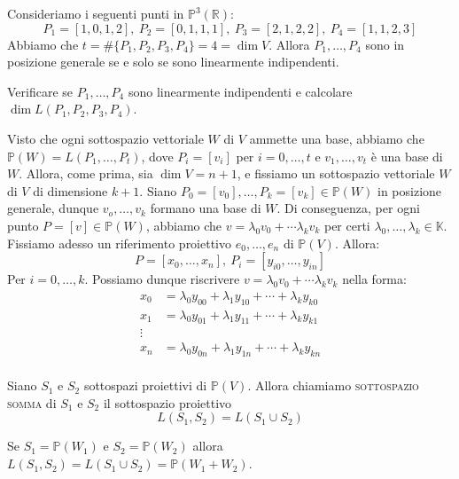 \begin{ex}
Consideriamo i seguenti punti in $\mathbb{P}^3(\mathbb{R})$:
$$P_1=[1,0,1,2],\ P_2=[0,1,1,1],\ P_3=[2,1,2,2],\ P_4=[1,1,2,3]$$
Abbiamo che $t=\#\{P_1,P_2,P_3,P_4\}=4=\dim V$. Allora $P_1,\dots,P_4$ sono in posizione generale se e solo se sono linearmente indipendenti.
\end{ex}

\begin{exc}
Verificare se $P_1,\dots,P_4$ sono linearmente indipendenti e calcolare $\dim L(P_1,P_2,P_3,P_4)$.
\end{exc}

\begin{oss}
Visto che ogni sottospazio vettoriale $W$ di $V$ ammette una base, abbiamo che $\mathbb{P}(W)=L(P_1,\dots,P_t)$, dove $P_i=[v_i]$ per $i=0,\dots,t$ e $v_1,\dots,v_t$ è una base di $W$. Allora, come prima, sia $\dim V=n+1$, e fissiamo un sottospazio vettoriale $W$ di $V$ di dimensione $k+1$. Siano $P_0=[v_0],\dots,P_k=[v_k] \in \mathbb{P}(W)$ in posizione generale, dunque $v_o,\dots,v_k$ formano una base di $W$. Di conseguenza, per ogni punto $P=[v] \in \mathbb{P}(W)$, abbiamo che $v=\lambda _0v_0+\cdots \lambda _kv_k$ per certi $\lambda_0,\dots,\lambda_k \in \mathbb{K}$. Fissiamo adesso un riferimento proiettivo $e_0,\dots,e_n$ di $\mathbb{P}(V)$. Allora:
$$P=[x_0,\dots,x_n],\ P_i=[y_{i0},\dots,y_{in}]$$
Per $i=0,\dots,k$. Possiamo dunque riscrivere $v=\lambda _0v_0+\cdots \lambda _kv_k$ nella forma:
\begin{align*}
x_0&=\lambda_0y_{00}+\lambda_1y_{10}+\cdots+\lambda_ky_{k0}\\
x_1&=\lambda_0y_{01}+\lambda_1y_{11}+\cdots+\lambda_ky_{k1}\\
\vdots\\
x_n&=\lambda_0y_{0n}+\lambda_1y_{1n}+\cdots+\lambda_ky_{kn}\\
\end{align*}
\end{oss}

\begin{defn}
Siano $S_1$ e $S_2$ sottospazi proiettivi di $\mathbb{P}(V)$. Allora chiamiamo \textsc{sottospazio somma} di $S_1$ e $S_2$ il sottospazio proiettivo
$$L(S_1,S_2)=L(S_1 \cup S_2)$$
\end{defn}

\begin{lm}
Se $S_1=\mathbb{P}(W_1)$ e $S_2=\mathbb{P}(W_2)$ allora $L(S_1,S_2)=L(S_1 \cup S_2)=\mathbb{P}(W_1+W_2)$.
\end{lm}

